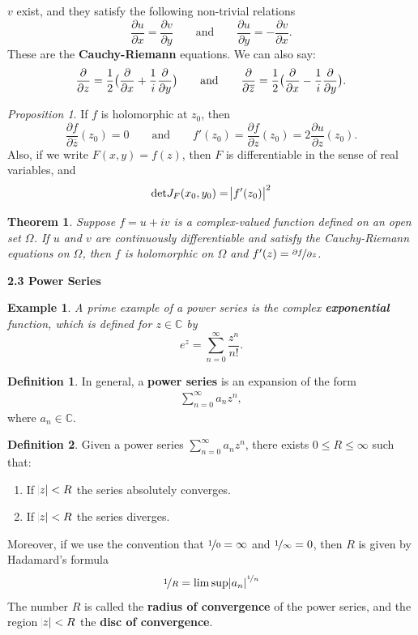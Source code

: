 \documentclass{article}
\newtheorem{theorem}{Theorem}
\newtheorem*{example}{Example}
\theoremstyle{definition}
\newtheorem{definition}{Definition}[section]
\theoremstyle{remark}
\newtheorem{prop}{Proposition}
\begin{document}
    $v$ exist, and they satisfy the following non-trivial relations
    \[ \frac{\partial{u}}{\partial{x}} = \frac{\partial{v}}{\partial{y}}\qquad\text{and}\qquad
        \frac{\partial{u}}{\partial{y}} = -\frac{\partial{v}}{\partial{x}}. \]
    These are the \textbf{Cauchy-Riemann} equations. We can also say:
    \[ \frac{\partial}{\partial{z}} = \frac{1}{2}\big{(}\frac{\partial}{\partial{x}} + \frac{1}{i}\frac{\partial}{\partial{y}}\big{)}
        \qquad\text{and}\qquad \frac{\partial}{\partial{\overline{z}}} = \frac{1}{2}\big{(}\frac{\partial}{\partial{x}}-
        \frac{1}{i}\frac{\partial}{\partial{y}}\big{)}. \]
    \begin{prop}
        If $f$ is holomorphic at $z_0$, then
        \[ \frac{\partial{f}}{\partial{\overline{z}}}(z_0) = 0\qquad\text{and}\qquad f'(z_0)=\frac{\partial{f}}{\partial{z}}(z_0)=
            2\frac{\partial{u}}{\partial{z}}(z_0). \]
        Also, if we write $F(x,y) = f(z)$, then $F$ is differentiable in the sense of real variables, and
        \[ \text{det}J_F(x_0,y_0) = \abs{f'(z_0)}^2 \]
    \end{prop}
    \begin{theorem}
        Suppose $f = u+iv$ is a complex-valued function defined on an open set $\Omega$. If $u$ and $v$ are continuously differentiable
        and satisfy the Cauchy-Riemann equations on $\Omega$, then $f$ is holomorphic on $\Omega$ and $f'(z) = 
        \nicefrac{\partial{f}}{\partial{z}}$.
    \end{theorem}

    \newpage

    \textbf{2.3 Power Series}
    \begin{example}
        A prime example of a power series is the complex \textbf{exponential} function, which is defined for $z\in\mathbb{C}$ by
        \[ e^z = \sum_{n=0}^{\infty} \frac{z^n}{n!}. \]
    \end{example}
    \begin{definition}
        In general, a \textbf{power series} is an expansion of the form
        \begin{align}
            \sum_{n=0}^{\infty} a_nz^n,
        \end{align}
        where $a_n\in\mathbb{C}$.
    \end{definition}
    \begin{definition}
        Given a power series $\sum_{n=0}^{\infty} a_nz^n$, there exists $0\leq R\leq \infty$ such that:
        \begin{enumerate}
            \item If $\abs{z}<R$ the series absolutely converges.
            \item If $\abs{z}<R$ the series diverges.
        \end{enumerate}
        Moreover, if we use the convention that $\nicefrac{1}{0}=\infty$ and $\nicefrac{1}{\infty} = 0$, then $R$ is given by
        Hadamard's formula
        \[ \nicefrac{1}{R} = \limsup \abs{a_n}^{\nicefrac{1}{n}} \]
        The number $R$ is called the \textbf{radius of convergence} of the power series, and the region $\abs{z}<R$ the 
        \textbf{disc of convergence}.
    \end{definition}
\end{document}
